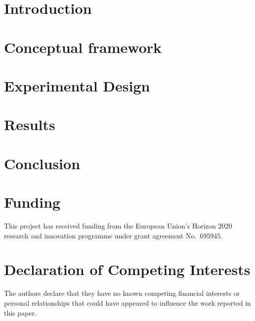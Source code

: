 \documentclass[12pt,a4paper]{article}
\begin{document}
\maketitle





\newpage


\section{Introduction}
\label{sec:Introduction}


\section{Conceptual framework}
\label{sec:Conceptual_framework}


\section{Experimental Design}
\label{sec:Experimental_design}


\section{Results}
\label{section:Results}


\section{Conclusion}
\label{section:Conclusion}


\section*{Funding}
This project has received funding from the European Union's Horizon 2020 research and innovation programme under grant agreement No.\ 695945.

\section*{Declaration of Competing Interests}
The authors declare that they have no known competing financial interests or personal relationships that could have appeared to influence the work reported in this paper.
\end{document}
